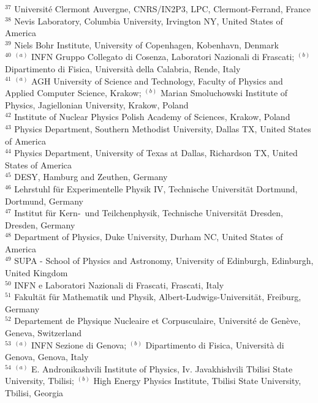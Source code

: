 \begin{flushleft}
$^{37}$ Universit{\'e} Clermont Auvergne, CNRS/IN2P3, LPC, Clermont-Ferrand, France\\
$^{38}$ Nevis Laboratory, Columbia University, Irvington NY, United States of America\\
$^{39}$ Niels Bohr Institute, University of Copenhagen, Kobenhavn, Denmark\\
$^{40}$ $^{(a)}$ INFN Gruppo Collegato di Cosenza, Laboratori Nazionali di Frascati; $^{(b)}$ Dipartimento di Fisica, Universit{\`a} della Calabria, Rende, Italy\\
$^{41}$ $^{(a)}$ AGH University of Science and Technology, Faculty of Physics and Applied Computer Science, Krakow; $^{(b)}$ Marian Smoluchowski Institute of Physics, Jagiellonian University, Krakow, Poland\\
$^{42}$ Institute of Nuclear Physics Polish Academy of Sciences, Krakow, Poland\\
$^{43}$ Physics Department, Southern Methodist University, Dallas TX, United States of America\\
$^{44}$ Physics Department, University of Texas at Dallas, Richardson TX, United States of America\\
$^{45}$ DESY, Hamburg and Zeuthen, Germany\\
$^{46}$ Lehrstuhl f{\"u}r Experimentelle Physik IV, Technische Universit{\"a}t Dortmund, Dortmund, Germany\\
$^{47}$ Institut f{\"u}r Kern-{~}und Teilchenphysik, Technische Universit{\"a}t Dresden, Dresden, Germany\\
$^{48}$ Department of Physics, Duke University, Durham NC, United States of America\\
$^{49}$ SUPA - School of Physics and Astronomy, University of Edinburgh, Edinburgh, United Kingdom\\
$^{50}$ INFN e Laboratori Nazionali di Frascati, Frascati, Italy\\
$^{51}$ Fakult{\"a}t f{\"u}r Mathematik und Physik, Albert-Ludwigs-Universit{\"a}t, Freiburg, Germany\\
$^{52}$ Departement  de Physique Nucleaire et Corpusculaire, Universit{\'e} de Gen{\`e}ve, Geneva, Switzerland\\
$^{53}$ $^{(a)}$ INFN Sezione di Genova; $^{(b)}$ Dipartimento di Fisica, Universit{\`a} di Genova, Genova, Italy\\
$^{54}$ $^{(a)}$ E. Andronikashvili Institute of Physics, Iv. Javakhishvili Tbilisi State University, Tbilisi; $^{(b)}$ High Energy Physics Institute, Tbilisi State University, Tbilisi, Georgia\\

\end{flushleft}
